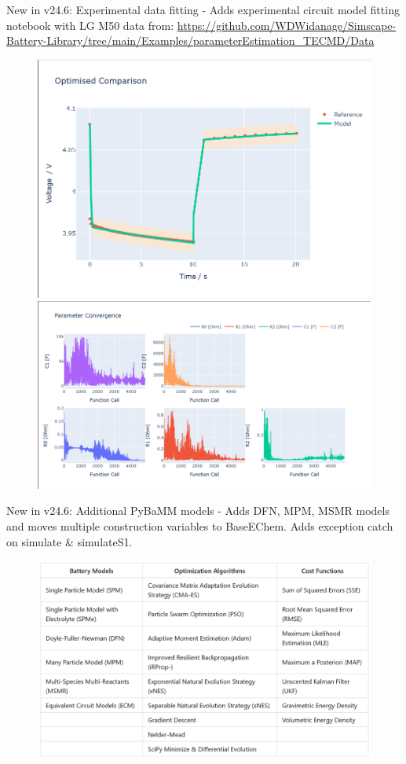 \documentclass[aspectratio=169]{beamer}
\begin{document}
\begin{frame}[fragile,t]{New in v24.6: Experimental data fitting}
    \vspace{-6mm}
     - Adds experimental circuit model fitting notebook with LG M50 data from: \href{https://github.com/WDWidanage/Simscape-Battery-Library/tree/main/Examples/parameterEstimation_TECMD/Data}{https://github.com/WDWidanage/Simscape-Battery-Library/tree/main/Examples/parameterEstimation\_TECMD/Data}
    \begin{figure}
        \centering
        \includegraphics[height=0.3\textwidth]{Images/Highlights/LGM50_Fig1.png}
        \includegraphics[height=0.3\textwidth]{Images/Highlights/LGM50_Fig2.png}
        \label{fig:LGM50}
    \end{figure}
\end{frame}

\begin{frame}{New in v24.6: Additional PyBaMM models}
    \vspace{-6mm}
     - Adds DFN, MPM, MSMR models and moves multiple construction variables to BaseEChem. Adds exception catch on simulate \& simulateS1.
    \begin{figure}
        \centering
        \includegraphics[height=0.35\textwidth]{Images/Diagrams/Supported_classes.png}
        \label{fig:supported_classes}
    \end{figure}
\end{frame}
\end{document}
